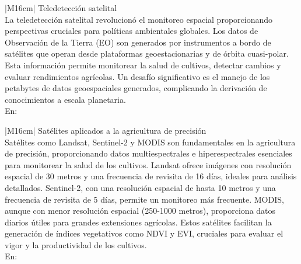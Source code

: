 \begin{table}[h!]
  \centering
  \renewcommand{\arraystretch}{2} %
  \begin{tabular}{|M{16cm}|}
    \hline
    Teledetección satelital \\
    \hline
    La teledetección satelital revolucionó el monitoreo espacial proporcionando perspectivas cruciales para políticas ambientales globales. Los datos de Observación de la Tierra (EO) son generados por instrumentos a bordo de satélites que operan desde plataformas geoestacionarias y de órbita cuasi-polar. Esta información permite monitorear la salud de cultivos, detectar cambios y evaluar rendimientos agrícolas. Un desafío significativo es el manejo de los petabytes de datos geoespaciales generados, complicando la derivación de conocimientos a escala planetaria.
    \\
    \hline
    En: \cite{En2009} \\
    \hline
  \end{tabular}
  \label{tab:argumento2b}
\end{table}

\begin{table}[h!]
  \centering
  \renewcommand{\arraystretch}{2} %
  \begin{tabular}{|M{16cm}|}
    \hline
    Satélites aplicados a la agricultura de precisión \\
    \hline
    Satélites como Landsat, Sentinel-2 y MODIS son fundamentales en la agricultura de precisión, proporcionando datos multiespectrales e hiperespectrales esenciales para monitorear la salud de los cultivos. Landsat ofrece imágenes con resolución espacial de 30 metros y una frecuencia de revisita de 16 días, ideales para análisis detallados. Sentinel-2, con una resolución espacial de hasta 10 metros y una frecuencia de revisita de 5 días, permite un monitoreo más frecuente. MODIS, aunque con menor resolución espacial (250-1000 metros), proporciona datos diarios útiles para grandes extensiones agrícolas. Estos satélites facilitan la generación de índices vegetativos como NDVI y EVI, cruciales para evaluar el vigor y la productividad de los cultivos.
    \\
    \hline
    En: \cite{Xia2023} \\
    \hline
  \end{tabular}
  \label{tab:argumento2c}
\end{table}

